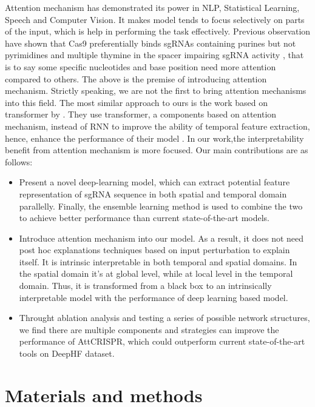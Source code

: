 \documentclass{bioinfo}
\begin{document}
Attention mechanism has demonstrated its power in NLP, Statistical Learning, Speech and Computer Vision. 
 It makes model tends to focus selectively on parts of the input, which is help in performing the task effectively. 
 Previous observation have shown that Cas9 preferentially binds sgRNAs containing purines but not pyrimidines \citep{wang2014genetic} and multiple thymine in the spacer impairing sgRNA activity \citep{wu2014genome-wide}, 
 that is to say some specific nucleotides and base position need more attention compared to others. 
 The above is the premise of introducing attention mechanism. Strictly speaking, we are not the first to bring attention mechanisms into this field. 
 The most similar approach to ours is the work based on transformer by \citeauthor{Liu2019}. 
 They use transformer, a components based on attention mechanism, instead of RNN to improve the ability of temporal feature extraction, 
 hence, enhance the performance of their model \citep{vaswani2017attention,Liu2019}. 
 In our work,the interpretability benefit from attention mechanism is more focused. 
 Our main contributions are as follows:\vspace*{1pt}
\begin{itemize}
    \item Present a novel deep-learning model, which can extract potential feature representation of sgRNA sequence in both spatial and temporal domain parallelly. 
    Finally, the ensemble learning method is used to combine the two to achieve better performance than current state-of-the-art models. 
    \item Introduce attention mechanism into our model. 
    As a result, it does not need post hoc explanations techniques based on input perturbation to explain itself. 
    It is intrinsic interpretable in both temporal and spatial domains.
    In the spatial domain it's at global level, while at local level in the temporal domain. 
    Thus, it is transformed from a black box to an intrinsically interpretable model with the performance of deep learning based model. 
    \item Throught ablation analysis and testing a series of possible network structures, 
    we find there are multiple components and strategies can improve the performance of AttCRISPR, 
    which could outperform current state-of-the-art tools on DeepHF dataset.\vspace*{1pt}
\end{itemize}

\section{Materials and methods}
\end{document}
